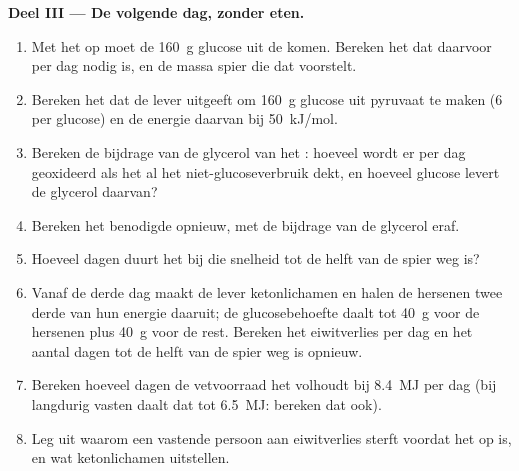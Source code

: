 \begin{problem}
\medskip
\noindent\textbf{Deel III --- De volgende dag, zonder eten.}
\begin{enumerate}[resume]
  \item Met het  op moet de \qty{160}{g} glucose uit de
         komen. Bereken het  dat daarvoor per dag nodig
        is, en de massa spier die dat voorstelt.
  \item Bereken het  dat de lever uitgeeft om \qty{160}{g} glucose uit
        pyruvaat te maken (6  per glucose) en de energie daarvan bij
        \qty{50}{kJ/mol}.
  \item Bereken de bijdrage van de glycerol van het : hoeveel  wordt
        er per dag geoxideerd als het al het niet-glucoseverbruik dekt, en
        hoeveel glucose levert de glycerol daarvan?
  \item Bereken het benodigde  opnieuw, met de bijdrage van de
        glycerol eraf.
  \item Hoeveel dagen duurt het bij die snelheid tot de helft van de spier
        weg is?
  \item Vanaf de derde dag maakt de lever ketonlichamen en halen de
        hersenen twee derde van hun energie daaruit; de glucosebehoefte
        daalt tot \qty{40}{g} voor de hersenen plus \qty{40}{g} voor de
        rest. Bereken het eiwitverlies per dag en het aantal dagen tot de
        helft van de spier weg is opnieuw.
  \item Bereken hoeveel dagen de vetvoorraad het volhoudt bij \qty{8.4}{MJ}
        per dag (bij langdurig vasten daalt dat tot \qty{6.5}{MJ}: bereken
        dat ook).
  \item Leg uit waarom een vastende persoon aan eiwitverlies sterft voordat
        het  op is, en wat ketonlichamen uitstellen.
\end{enumerate}


\end{problem}

